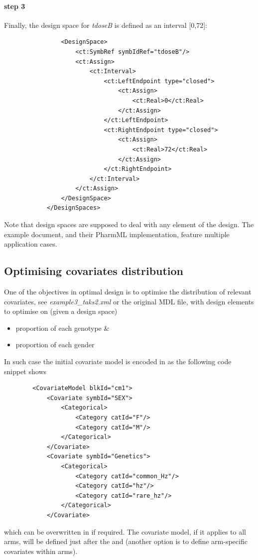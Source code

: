 \paragraph{step 3} Finally, the design space for \emph{tdoseB} is defined as 
an interval [0,72]:
\lstset{language=XML}
\begin{lstlisting}
                <DesignSpace>
                    <ct:SymbRef symbIdRef="tdoseB"/>
                    <ct:Assign>
                        <ct:Interval>
                            <ct:LeftEndpoint type="closed">
                                <ct:Assign>
                                    <ct:Real>0</ct:Real>
                                </ct:Assign>
                            </ct:LeftEndpoint>
                            <ct:RightEndpoint type="closed">
                                <ct:Assign>
                                    <ct:Real>72</ct:Real>
                                </ct:Assign>
                            </ct:RightEndpoint>
                        </ct:Interval>
                    </ct:Assign>
                </DesignSpace>
            </DesignSpaces>            
\end{lstlisting}
Note that design spaces are supposed to \marginpar{\HandCuffLeft} deal with 
any element of the design. The example document, \cite{CommetsExamples2015} and
their PharmML implementation, feature multiple application cases.

\subsection{Optimising covariates distribution}
One of the objectives in optimal design is to optimise the distribution of 
relevant covariates, see \emph{example3\_taks2.xml} or the original MDL file, with 
design elements to optimise on (given a design space)
\begin{itemize}
\item
proportion of each genotype \& 
\item
proportion of each gender
\end{itemize}
In such case the initial covariate model is encoded in  as the following
code snippet shows
\lstset{language=XML}
\begin{lstlisting}
        <CovariateModel blkId="cm1">
            <Covariate symbId="SEX">
                <Categorical>
                    <Category catId="F"/>
                    <Category catId="M"/>
                </Categorical>
            </Covariate>
            <Covariate symbId="Genetics">
                <Categorical>
                    <Category catId="common_Hz"/>
                    <Category catId="hz"/>
                    <Category catId="rare_hz"/>
                </Categorical>
            </Covariate>
\end{lstlisting}
which can be overwritten in  if required. 
The covariate model, if it applies to all arms, will be defined just after 
the  and  (another option is to define 
arm-specific covariates within arms).

